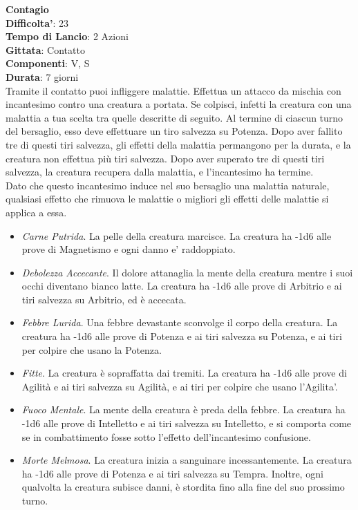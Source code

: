 \begin{multicols}{2}
\medskip\textbf{Contagio}\\
\textbf{Difficolta'}: 23\\
\textbf{Tempo di Lancio}: 2 Azioni\\
\textbf{Gittata}: Contatto\\
\textbf{Componenti}: V, S\\
\textbf{Durata}: 7 giorni\\
Tramite il contatto puoi infliggere malattie. Effettua un attacco da mischia con incantesimo contro una creatura a portata. Se colpisci, infetti la creatura con una malattia a tua scelta tra quelle descritte di seguito. Al termine di ciascun turno del bersaglio, esso deve effettuare un tiro salvezza su Potenza. Dopo aver fallito tre di questi tiri salvezza, gli effetti della malattia permangono per la durata, e la creatura non effettua più tiri salvezza. Dopo aver superato tre di questi tiri salvezza, la creatura recupera dalla malattia, e l’incantesimo ha termine. \\
Dato che questo incantesimo induce nel suo bersaglio una malattia naturale, qualsiasi effetto che rimuova le malattie o migliori gli effetti delle malattie si applica a essa.\\
\begin{itemize}
	\item 
	\textit{Carne Putrida}. La pelle della creatura marcisce. La creatura ha -1d6 alle prove di Magnetismo e ogni danno e' raddoppiato.
\item 
	\textit{Debolezza Accecante}. Il dolore attanaglia la mente della creatura mentre i suoi occhi diventano bianco latte. La creatura ha -1d6  alle prove di Arbitrio e ai tiri salvezza su Arbitrio, ed è accecata.
\item 
   \textit{Febbre Lurida}. Una febbre devastante sconvolge il corpo della creatura. La creatura ha -1d6 alle prove di Potenza e ai tiri salvezza su Potenza, e ai tiri per
colpire che usano la Potenza.
\item 
\textit{Fitte}. La creatura è sopraffatta dai tremiti. La creatura ha -1d6 alle prove di Agilità e ai tiri salvezza su Agilità, e ai tiri per colpire che usano l'Agilita'.
\item 
\textit{Fuoco Mentale}. La mente della creatura è preda della febbre. La creatura ha -1d6 alle prove di Intelletto e ai tiri salvezza su Intelletto, e si comporta come se in combattimento fosse sotto l’effetto dell’incantesimo confusione.
\item 
\textit{Morte Melmosa}. La creatura inizia a sanguinare incessantemente. La creatura ha -1d6 alle prove di Potenza e ai tiri salvezza su Tempra. Inoltre, ogni qualvolta la creatura subisce danni, è stordita fino alla fine del suo prossimo turno.
\end{itemize}


\end{multicols}
